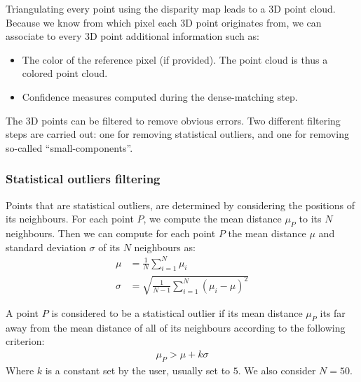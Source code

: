 Triangulating every point using the disparity map leads to a 3D point cloud. Because we know from which pixel each 3D point originates from, we can associate to every 3D point additional information such as:
\begin{itemize}
    \item The color of the reference pixel (if provided). The point cloud is thus a colored point cloud.
    \item Confidence measures computed during the dense-matching step. 
\end{itemize}

The 3D points can be filtered to remove obvious errors. Two different filtering steps are carried out: one for removing statistical outliers, and one for removing so-called ``small-components''. 
\subsubsection{Statistical outliers filtering}
Points that are statistical outliers, are determined by considering the positions of its neighbours. For each point $P$, we compute the mean distance $\mu_P$ to its $N$ neighbours. Then we can compute for each point $P$ the mean distance $\mu$ and standard deviation $\sigma$ of its $N$ neighbours as:
\begin{align}
    \mu &= \frac{1}{N}\sum_{i=1}^N\mu_i\\
    \sigma &= \sqrt{\frac{1}{N-1}\sum_{i=1}^N(\mu_i-\mu)^2}
\end{align}

A point $P$ is considered to be a statistical outlier if its mean distance $\mu_P$ its far away from the mean distance of all of its neighbours according to the following criterion:
\begin{align}\label{eq:statistical_outlier}
    \mu_P>\mu+k\sigma
\end{align}
Where $k$ is a constant set by the user, usually set to $5$. We also consider $N=50$.

